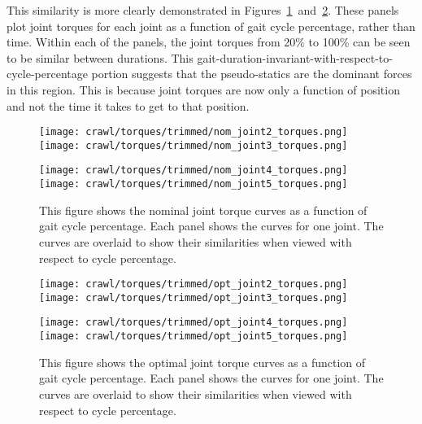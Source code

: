 This similarity is more clearly demonstrated in
Figures~\ref{fig:vrep_nom_joint_torques_by_joint_over_cycle1}~and~\ref{fig:vrep_opt_joint_torques_by_joint_over_cycle1}.
These panels plot joint torques
for each joint as a function of gait cycle percentage, rather than time. Within each of the
panels, the joint torques from 20\% to 100\% can be seen to be similar between durations. 
This gait-duration-invariant-with-respect-to-cycle-percentage portion suggests that
the pseudo-statics are the dominant forces in this region. This is because joint torques
are now only a function of position and not the time it takes to get to that position.

\begin{figure}
\centering
\texttt{[image: crawl/torques/trimmed/nom\_joint2\_torques.png]}
\texttt{[image: crawl/torques/trimmed/nom\_joint3\_torques.png]}

\centering
\texttt{[image: crawl/torques/trimmed/nom\_joint4\_torques.png]}
\texttt{[image: crawl/torques/trimmed/nom\_joint5\_torques.png]}

\caption{This figure shows the nominal joint torque curves as a function of gait cycle percentage.
         Each panel shows the curves for one joint. The curves are overlaid to show their
         similarities when viewed with respect to cycle percentage.}
\label{fig:vrep_nom_joint_torques_by_joint_over_cycle1}
\end{figure}

\begin{figure}
\centering
\texttt{[image: crawl/torques/trimmed/opt\_joint2\_torques.png]}
\texttt{[image: crawl/torques/trimmed/opt\_joint3\_torques.png]}

\centering
\texttt{[image: crawl/torques/trimmed/opt\_joint4\_torques.png]}
\texttt{[image: crawl/torques/trimmed/opt\_joint5\_torques.png]}

\caption{This figure shows the optimal joint torque curves as a function of gait cycle percentage.
         Each panel shows the curves for one joint. The curves are overlaid to show their
         similarities when viewed with respect to cycle percentage.}
\label{fig:vrep_opt_joint_torques_by_joint_over_cycle1}
\end{figure}

